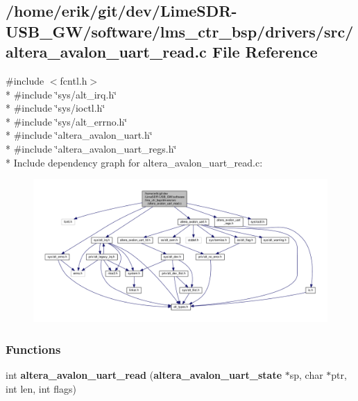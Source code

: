 \subsection{/home/erik/git/dev/\+Lime\+S\+D\+R-\/\+U\+S\+B\+\_\+\+G\+W/software/lms\+\_\+ctr\+\_\+bsp/drivers/src/altera\+\_\+avalon\+\_\+uart\+\_\+read.c File Reference}
\label{altera__avalon__uart__read_8c}
{\ttfamily \#include $<$fcntl.\+h$>$}\\*
{\ttfamily \#include \char`\"{}sys/alt\+\_\+irq.\+h\char`\"{}}\\*
{\ttfamily \#include \char`\"{}sys/ioctl.\+h\char`\"{}}\\*
{\ttfamily \#include \char`\"{}sys/alt\+\_\+errno.\+h\char`\"{}}\\*
{\ttfamily \#include \char`\"{}altera\+\_\+avalon\+\_\+uart.\+h\char`\"{}}\\*
{\ttfamily \#include \char`\"{}altera\+\_\+avalon\+\_\+uart\+\_\+regs.\+h\char`\"{}}\\*
Include dependency graph for altera\+\_\+avalon\+\_\+uart\+\_\+read.\+c\+:
\nopagebreak
\begin{figure}[H]
\begin{center}
\leavevmode
\includegraphics[width=350pt]{d1/d87/altera__avalon__uart__read_8c__incl}
\end{center}
\end{figure}
\subsubsection*{Functions}
\begin{DoxyCompactItemize}
\item 
int {\bf altera\+\_\+avalon\+\_\+uart\+\_\+read} ({\bf altera\+\_\+avalon\+\_\+uart\+\_\+state} $\ast$sp, char $\ast$ptr, int len, int flags)
\end{DoxyCompactItemize}


